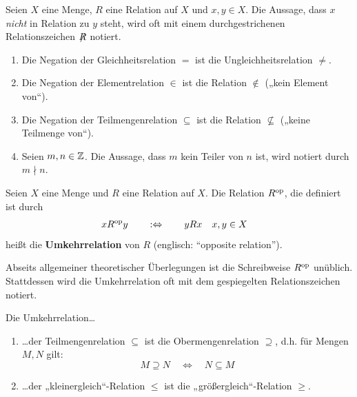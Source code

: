 \begin{nota}
    Seien $X$ eine Menge, $R$ eine Relation auf $X$ und $x,y\in X$. Die Aussage, dass $x$ \emph{nicht} in Relation zu $y$ steht, wird oft mit einem durchgestrichenen Relationszeichen $\not\mathrel{R}$ notiert.
\end{nota}


\begin{bsp} \quad
    \begin{enumerate}
        \item Die Negation der Gleichheitsrelation $=$ ist die Ungleichheitsrelation $\neq$.
        \item Die Negation der Elementrelation $\in$ ist die Relation $\notin$ („kein Element von“).
        \item Die Negation der Teilmengenrelation $\subseteq$ ist die Relation $\nsubseteq$ („keine Teilmenge von“).
        \item Seien $m,n\in \mathbb Z$. Die Aussage, dass $m$ kein Teiler von $n$ ist, wird notiert durch $m\nmid n$.
    \end{enumerate}
\end{bsp}


\begin{defin}[Umkehrrelation] \label{def:umkehrrel} 
    Seien $X$ eine Menge und $R$ eine Relation auf $X$. Die Relation $R^{\mathrm{op}}$, die definiert ist durch
    \begin{align*}
        xR^{\mathrm{op}} y \qquad &:\Leftrightarrow\qquad yRx && x,y\in X
    \end{align*}
    heißt die \textbf{Umkehrrelation} von $R$ (englisch: ``opposite relation''). 
\end{defin}


\begin{nota} \label{spiegelrel}
    Abseits allgemeiner theoretischer Überlegungen ist die Schreibweise $R^{\mathrm{op}}$ unüblich. Stattdessen wird die Umkehrrelation oft mit dem gespiegelten Relationszeichen  notiert.
\end{nota}


\begin{bsp}
    Die Umkehrrelation\dots
    \begin{enumerate}
        \item \dots der Teilmengenrelation $\subseteq$ ist die Obermengenrelation $\supseteq$, d.h. für Mengen $M,N$ gilt:
            \[M\supseteq N \quad\iff\quad N\subseteq M \]
        \item \dots der „kleinergleich“-Relation $\le$ ist die „größergleich“-Relation $\ge$.
    \end{enumerate}
\end{bsp}


